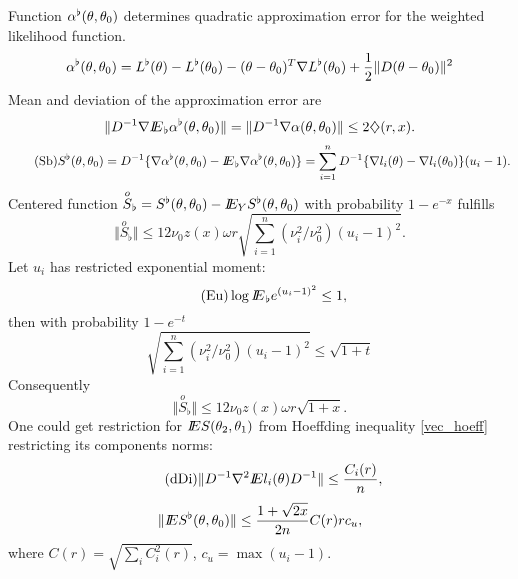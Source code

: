 Function $\alphab12$ determines quadratic approximation error for the weighted likelihood function.
\[
\alphab12 = \Lbf - \Lb0 - (\theta - \theta_0)^{T} \nabla \Lb0 + \frac{1}{2} \Vert  D(\theta - \theta_0) \Vert^2
\]
Mean and deviation of the approximation error are 
$$
\Vert D^{-1} \nabla \Eb \alphab12 \Vert =   \Vert D^{-1} \nabla  \alpha(\theta, \theta_0) \Vert 
\leq 2 \diamondsuit(r,x).
$$
\begin{equation*}
\label{S}\tag{Sb}
S^{\flat}(\theta, \theta_0) = D^{-1} \{\nabla \alphab12 -  \Eb \nabla \alphab12 \}
= \sum_{i=1}^{n} D^{-1} \{\nabla l_i(\theta) - \nabla l_i(\theta_0) \}  (u_i-1).
\end{equation*}
Centered function $ {\overset{o}{S}}_{\flat}= S^{\flat}(\theta, \theta_0) - I\!\!E_{Y} S^{\flat}(\theta, \theta_0)$ with probability $1- e^{-x}$ fulfills 
\[
\Vert {\overset{o}{S}}_{\flat} \Vert \leq 
12 \nu_0  z(x) \omega r \sqrt{\sum_{i=1}^{n} (\nu_i^2 / \nu_0^2) (u_i - 1)^2 } .
\] 
Let $u_i$ has restricted exponential moment:
\begin{equation*}
\label{Eu1}\tag{Eu}
\log I\!\!E_{\hspace{1pt} \flat} e^{(u_i - 1)^2} \leq 1,
\end{equation*} 
then with probability $1 - e^{-t}$ 
\[
\sqrt{\sum_{i=1}^{n} (\nu_i^2 / \nu_0^2) (u_i - 1)^2 } \leq  \sqrt{1+t} 
\]
Consequently 
\[
\Vert {\overset{o}{S}}_{\flat} \Vert \leq 
12 \nu_0  z(x) \omega r  \sqrt{1+x}. 
\]
One could get restriction for  $I\!\!E S(\theta_2, \theta_1)$ from Hoeffding inequality \ref{vec_hoeff} restricting its components norms:
\begin{equation*}\label{Li}
\tag{dDi}
\Vert D^{-1} \nabla^2 I\!\!E l_i (\theta)  D^{-1} \Vert \leq
\frac{C_i(r)}{n},
\end{equation*}
\[
\Vert I\!\!E S^{\flat}(\theta, \theta_0) \Vert \leq 
\frac{1 + \sqrt{2x}}{2n}  C(r) r c_u,
\] 
where $C(r) = \sqrt{\sum_i C_i^2 (r)}$, $c_u = \max (u_i - 1)$. 

